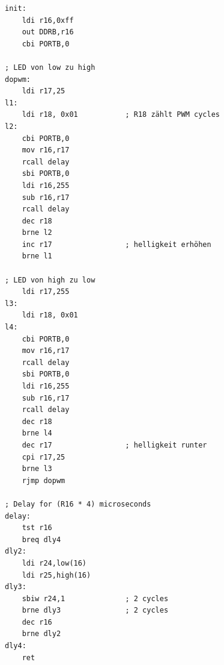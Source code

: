 \documentclass[a4paper,12pt,titlepage]{scrartcl}
\begin{document}
\begin{lstlisting}[basicstyle=\tiny]
init:
    ldi r16,0xff            
    out DDRB,r16
    cbi PORTB,0             

; LED von low zu high
dopwm:      
    ldi r17,25              
l1:         
    ldi r18, 0x01           ; R18 zählt PWM cycles
l2:         
    cbi PORTB,0            
    mov r16,r17         
    rcall delay      
    sbi PORTB,0           
    ldi r16,255
    sub r16,r17             
    rcall delay        
    dec r18                 
    brne l2
    inc r17                 ; helligkeit erhöhen
    brne l1

; LED von high zu low
    ldi r17,255             
l3:         
    ldi r18, 0x01          
l4:         
    cbi PORTB,0             
    mov r16,r17             
    rcall delay        
    sbi PORTB,0             
    ldi r16,255
    sub r16,r17             
    rcall delay         
    dec r18                
    brne l4
    dec r17                 ; helligkeit runter
    cpi r17,25   
    brne l3
    rjmp dopwm  

; Delay for (R16 * 4) microseconds
delay:  
    tst r16                 
    breq dly4
dly2:       
    ldi r24,low(16)
    ldi r25,high(16)
dly3:       
    sbiw r24,1              ; 2 cycles
    brne dly3               ; 2 cycles
    dec r16
    brne dly2
dly4:       
    ret    
\end{lstlisting}
\end{document}
